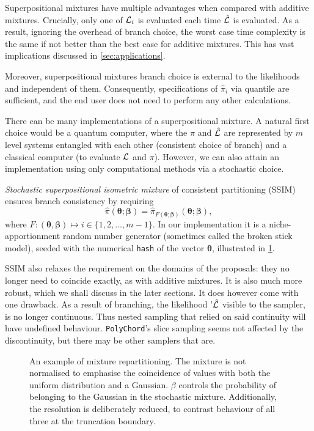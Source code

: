 \documentclass[usenatbib]{mnras}
\begin{document}
Superpositional mixtures have multiple advantages when compared with
additive mixtures. Crucially, only one of ${\cal L}_{i}$ is evaluated
each time $\hat{\cal L}$ is evaluated. As a result, ignoring the
overhead of branch choice, the worst case time complexity is the same
if not better than the best case for additive mixtures. This has vast
implications discussed in \cref{sec:applications}.

Moreover, superpositional mixtures branch choice is external to the
likelihoods and independent of them. Consequently, specifications of
$\hat{\pi}_{i}$ via quantile are sufficient, and the end user does not
need to perform any other calculations.

There can be many implementations of a superpositional mixture. A
natural first choice would be a quantum computer, where the
$\hat{\pi}$ and $\hat{\cal L}$ are represented by \(m\) level
systems entangled with each other (consistent choice of branch) and a
classical computer (to evaluate ${\cal L}$ and $\pi$). However, we can
also attain an implementation using only computational methods via a
stochastic choice.

\emph{Stochastic superpositional isometric mixture} of consistent
partitioning (SSIM) ensures branch consistency by requiring
\begin{equation}
\hat{\pi}(\bm{\theta}; \bm{\beta}) = \hat{\pi}_{F(\bm{\theta};
  \bm{\beta})}(\bm{\theta};\bm{\beta}),
\end{equation}
where
$F: (\bm{\theta}, \bm{\beta}) \mapsto i \in \{1, 2, \ldots, m-1\}$. In
our implementation it is a niche-apportionment random number generator
(sometimes called the broken stick model), seeded with the numerical
\texttt{hash} of the vector $\bm{\theta}$, illustrated in
\cref{fig:mixture}.

SSIM also relaxes the requirement on the domains of the proposals:
they no longer need to coincide exactly, as with additive mixtures.
It is also much more robust, which we shall discuss
in the later sections. It does however come with one drawback. As a
result of branching, the likelihood '$\hat{\cal L}$ visible to the
sampler, is no longer continuous. Thus nested sampling that relied on
said continuity will have undefined behaviour. \texttt{PolyChord}'s
slice sampling seems not affected by the discontinuity, but there may be
other samplers that are.
\begin{figure}  
  

  

  
  \caption{An example of mixture repartitioning. The mixture is not
    normalised to emphasise the coincidence of values with both the
    uniform distribution and a Gaussian. $\beta$ controls the
    probability of belonging to the Gaussian in the stochastic
    mixture.  Additionally, the resolution is deliberately reduced, to
    contrast behaviour of all three at the truncation
    boundary. \label{fig:mixture}}
\end{figure}
\end{document}
